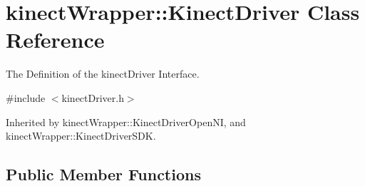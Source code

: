 \section{kinect\+Wrapper\+:\+:Kinect\+Driver Class Reference}
\label{classkinectWrapper_1_1KinectDriver}


The Definition of the kinect\+Driver Interface.  




{\ttfamily \#include $<$kinect\+Driver.\+h$>$}



Inherited by kinect\+Wrapper\+::\+Kinect\+Driver\+Open\+N\+I, and kinect\+Wrapper\+::\+Kinect\+Driver\+S\+D\+K.

\subsection*{Public Member Functions}
